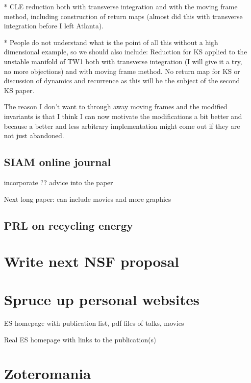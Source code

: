 * CLE reduction both with transverse integration and with the
moving frame method, including construction of return maps
(almost did this with transverse integration before I left
Atlanta).

* People do not understand what is the point of all this
without a high dimensional example, so we should also
include: Reduction for KS applied to the unstable manifold of
TW1 both with transverse integration (I will give it a try,
no more objections) and with moving frame method. No return
map for KS or discussion of dynamics and recurrence as this
will be the subject of the second KS paper.

The reason I don't want to through away moving frames and the
modified invariants is that I think I can now motivate the
modifications a bit better and because a better and less
arbitrary implementation might come out if they are not just
abandoned.

\subsection{SIAM online journal}

incorporate ?? advice into the paper

Next long paper: can include movies and more graphics

\subsection{PRL on recycling energy}

\section{Write next NSF proposal }

\section{Spruce up personal websites}

ES homepage with publication list, pdf files of talks, movies

Real ES homepage with links to the publication(s)

\section{Zoteromania}

